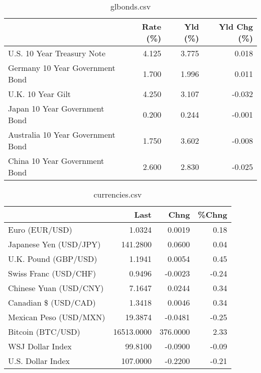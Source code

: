 \documentclass{article}%
\begin{document}
%


\begin{table}[htbp]%
\caption{glbonds.csv}%
\centering%
\begin{adjustbox}{width=1\textwidth}%
\begin{tabular}{lrrr}
\toprule
                                  &  Rate (\%) &  Yld (\%) &  Yld Chg (\%) \\
\midrule
       U.S. 10 Year Treasury Note &     4.125 &    3.775 &        0.018 \\
  Germany 10 Year Government Bond &     1.700 &    1.996 &        0.011 \\
                U.K. 10 Year Gilt &     4.250 &    3.107 &       -0.032 \\
    Japan 10 Year Government Bond &     0.200 &    0.244 &       -0.001 \\
Australia 10 Year Government Bond &     1.750 &    3.602 &       -0.008 \\
    China 10 Year Government Bond &     2.600 &    2.830 &       -0.025 \\
\bottomrule
\end{tabular}
%
\end{adjustbox}%
\end{table}

%


\begin{table}[htbp]%
\caption{currencies.csv}%
\centering%
\begin{adjustbox}{width=1\textwidth}%
\begin{tabular}{lrrr}
\toprule
                       &       Last &     Chng &  \%Chng \\
\midrule
        Euro (EUR/USD) &     1.0324 &   0.0019 &   0.18 \\
Japanese Yen (USD/JPY) &   141.2800 &   0.0600 &   0.04 \\
  U.K. Pound (GBP/USD) &     1.1941 &   0.0054 &   0.45 \\
 Swiss Franc (USD/CHF) &     0.9496 &  -0.0023 &  -0.24 \\
Chinese Yuan (USD/CNY) &     7.1647 &   0.0244 &   0.34 \\
  Canadian \$ (USD/CAD) &     1.3418 &   0.0046 &   0.34 \\
Mexican Peso (USD/MXN) &    19.3874 &  -0.0481 &  -0.25 \\
     Bitcoin (BTC/USD) & 16513.0000 & 376.0000 &   2.33 \\
      WSJ Dollar Index &    99.8100 &  -0.0900 &  -0.09 \\
     U.S. Dollar Index &   107.0000 &  -0.2200 &  -0.21 \\
\bottomrule
\end{tabular}
%
\end{adjustbox}%
\end{table}

%
\end{document}

